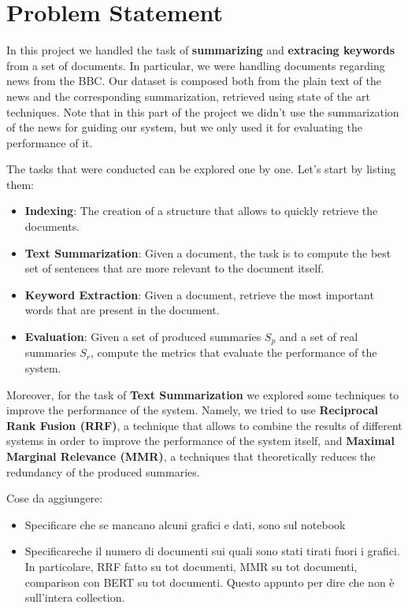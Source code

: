 \section{Problem Statement}
In this project we handled the task of \textbf{summarizing} and \textbf{extracing keywords} from a set of documents. In particular, 
we were handling documents regarding news from the BBC.
Our dataset is composed both from the plain text of the news and the corresponding summarization, retrieved using state of the art 
techniques. Note that in this part of the project we didn't use the summarization
of the news for guiding our system, but we only used 
it for evaluating the performance of it.

The tasks that were conducted can be explored one by one. Let's start by 
listing them:

\begin{itemize}
    \item \textbf{Indexing}: The creation of a structure 
    that allows to quickly retrieve the documents.
    \item \textbf{Text Summarization}: Given a document, the task is to 
    compute the best set of sentences that are more relevant to the document itself.
    \item \textbf{Keyword Extraction}: Given a document, retrieve the
    most important words that are present in the document.
    \item \textbf{Evaluation}: Given a set of produced summaries $S_p$ and a set of real summaries $S_r$,
    compute the metrics that evaluate the performance of the system.
\end{itemize}

Moreover, for the task of \textbf{Text Summarization} we explored 
some techniques to improve the performance of the system. Namely, 
we tried to use \textbf{Reciprocal Rank Fusion (RRF)}, a technique that
allows to combine the results of different systems in order to
improve the performance of the system itself, and \textbf{Maximal Marginal Relevance (MMR)}, a techniques that
theoretically reduces the redundancy of the produced summaries.

Cose da aggiungere:
\begin{itemize}
    \item Specificare che se mancano alcuni grafici e dati, sono sul notebook
    \item Specificareche il numero di documenti sui quali sono stati tirati fuori i grafici. In particolare, RRF fatto su tot documenti, MMR su tot documenti, comparison con BERT su tot documenti.  Questo appunto per dire che non è sull'intera collection.
\end{itemize}
